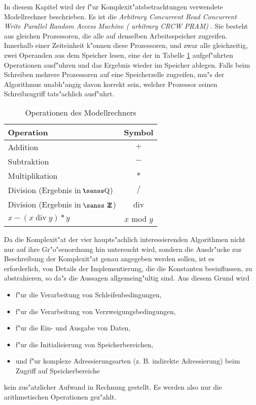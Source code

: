 
\label{SecModell}
  
In diesem Kapitel wird der f"ur Komplexit"atsbetrachtungen verwendete
Modellrechner beschrieben. Es ist die 
{\em Arbitrary Concurrent Read Concurrent Write Parallel Random Access 
  Machine ( arbitrary CRCW PRAM) }.
Sie besteht aus
gleichen Prozessoren, die alle auf denselben Arbeitsspeicher zugreifen.
Innerhalb einer Zeiteinheit k"onnen diese
Prozessoren, und zwar alle gleichzeitig,
zwei Operanden aus dem Speicher lesen, eine der in Tabelle \ref{Csan76Tab2}
aufgef"uhrten Operationen ausf"uhren und
das Ergebnis wieder im Speicher ablegen. Falls beim
Schreiben mehrere Prozessoren auf eine Speicherzelle zugreifen, mu"s der
Algorithmus unabh"angig davon korrekt sein, welcher Prozessor seinen
Schreibzugriff tats"achlich ausf"uhrt.
\begin{table}[htb]
    \begin{center}
    \begin{tabular}{|p{4cm}|c|}
        \hline
        Operation & Symbol \\
        \hline
        \hline
        Addition & $+$ \\
        \hline
        Subtraktion & $-$ \\
        \hline
        Multiplikation & $*$ \\
        \hline
        Division (Ergebnis in $\Rationals$) & $/$ \\
        \hline
        Division (Ergebnis in $\Integers$) & div \\
        \hline
        $ x - (x \; \mbox{div} \; y) * y $ & $x$ mod $y$ \\
        \hline
    \end{tabular}
    \end{center}
    \caption{Operationen des Modellrechners}
    \label{Csan76Tab2}
\end{table}
Da die
Komplexit"at der vier haupts"achlich interessierenden 
Algorithmen nicht nur auf ihre Gr"o"senordnung hin
untersucht wird, sondern die Ausdr"ucke zur Beschreibung der Komplexit"at
genau angegeben werden sollen, ist es erforderlich, von Details
der Implementierung, die die Konstanten
beeinflussen, zu abstrahieren, so da"s die Aussagen allgemeing"ultig sind.
Aus diesem Grund wird
\begin{itemize}
    \item f"ur die Verarbeitung von Schleifenbedingungen,
    \item f"ur die Verarbeitung von Verzweigungsbedingungen,
    \item f"ur die Ein- und Ausgabe von Daten,
    \item f"ur die Initialisierung von Speicherbereichen,
    \item und f"ur komplexe Adressierungsarten
          (z. B. indirekte Adressierung) beim Zugriff auf Speicherbereiche
\end{itemize}
kein zus"atzlicher Aufwand in Rechnung gestellt. Es werden also nur die
arithmetischen Operationen gez"ahlt.

